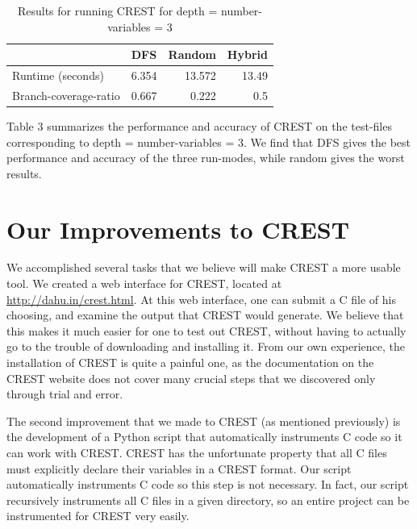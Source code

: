 \documentclass[oribibl]{llncs}
\begin{document}
\begin{table}[htbp]
\caption{Results for running CREST for depth = number-variables = 3}
\begin{center}
\begin{tabular}{|l|r|r|r|}
\hline
 & \multicolumn{1}{l|}{DFS} & \multicolumn{1}{l|}{Random} & \multicolumn{1}{l|}{Hybrid} \\ \hline
Runtime (seconds) & 6.354 & 13.572 & 13.49 \\ \hline
Branch-coverage-ratio & 0.667 & 0.222 & 0.5 \\ \hline
\end{tabular}
\end{center}
\label{DFS timings (in seconds)}
\end{table}


Table 3 summarizes the performance and accuracy of CREST on the test-files corresponding to depth = number-variables = 3. We find that DFS gives the best performance and accuracy of the three run-modes, while random gives the worst results.

\section{Our Improvements to CREST}
\label{sctn:Improvements}
We accomplished several tasks that we believe will make CREST a more usable tool. We created a web interface for CREST, located at \url{http://dahu.in/crest.html}. At this web interface, one can submit a C file of his choosing, and examine the output that CREST would generate. We believe that this makes it much easier for one to test out CREST, without having to actually go to the trouble of downloading and installing it. From our own experience, the installation of CREST is quite a painful one, as the documentation on the CREST website does not cover many crucial steps that we discovered only through trial and error.

The second improvement that we made to CREST (as mentioned previously) is the development of a Python script that automatically instruments C code so it can work with CREST. CREST has the unfortunate property that all C files must explicitly declare their variables in a CREST format. Our script automatically instruments C code so this step is not necessary. In fact, our script recursively instruments all C files in a given directory, so an entire project can be instrumented for CREST very easily.

\end{document}
